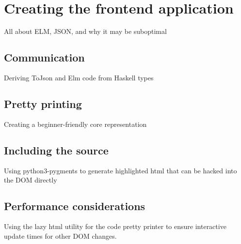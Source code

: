 \section{Creating the frontend application}
All about ELM, JSON, and why it may be suboptimal

\subsection{Communication}
Deriving ToJson and Elm code from Haskell types

\subsection{Pretty printing}
Creating a beginner-friendly core representation

\subsection{Including the source}
Using python3-pygments to generate highlighted html that can be hacked into the DOM directly

\subsection{Performance considerations}
Using the lazy html utility for the code pretty printer to ensure interactive
update times for other DOM changes.
